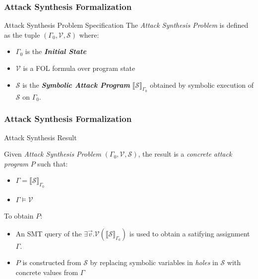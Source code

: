 \documentclass{beamer}
\newcommand{\boldIt}[1]{\textbf{\textit{#1}}}
\newcommand{\vect}[1]{\overrightarrow{#1}}
\begin{document}
\begin{frame}[fragile]
  \frametitle{Attack Synthesis Formalization}
  \begin{block}{Attack Synthesis Problem Specification}
      The \textit{Attack Synthesis Problem} is defined as the
      tuple $(\Gamma_0, \mathcal{V}, \mathcal{S})$ where:
      \begin{itemize}
          \item $\Gamma_0$ is the \boldIt{Initial State}
          \item $\mathcal{V}$ is a FOL formula over program state
          \item $\mathcal{S}$ is the \boldIt{Symbolic Attack Program}
            $\llbracket \mathcal{S} \rrbracket_{\Gamma_0}$ obtained
            by symbolic execution of $\mathcal{S}$ on $\Gamma_0$.
      \end{itemize}
  \end{block}
\end{frame}

\begin{frame}
  \frametitle{Attack Synthesis Formalization}

  \begin{block}{Attack Synthesis Result}

    Given \textit{Attack Synthesis Problem} $(\Gamma_0, \mathcal{V},  \mathcal{S})$,
    the result is a \textit{concrete attack program} $P$ such that:
    \begin{itemize}
      \item $\Gamma = \llbracket \mathcal{S} \rrbracket_{\Gamma_0}$
      \item $\Gamma \vDash \mathcal{V}$
    \end{itemize}
  \end{block}
   \pause
    To obtain $P$:
    \begin{itemize}
      \item An SMT query of the $ \exists \vect{v} .
          \mathcal{V}(\llbracket \mathcal{S} \rrbracket_{\Gamma_0})$
          is used to obtain a satifying assignment $\Gamma$.
        \item $P$ is constructed from $\mathcal{S}$ by replacing
          symbolic variables in \textit{holes} in $\mathcal{S}$
          with concrete values from $\Gamma$
    \end{itemize}
\end{frame}
\end{document}
